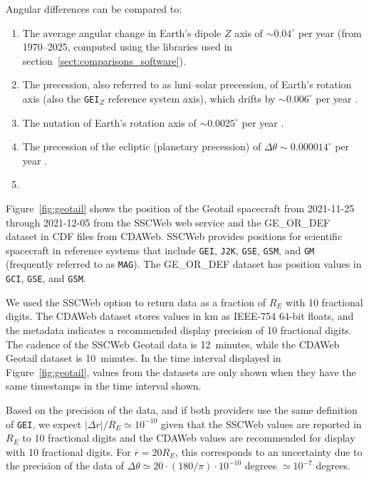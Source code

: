 \documentclass[draft]{agujournal2019}
\begin{document}
\noindent Angular differences can be compared to:
\begin{enumerate}
    \item The average angular change in Earth's dipole $Z$ axis of ${\sim} 0.04^\circ$ per year (from 1970--2025, computed using the libraries used in section~\ref{sect:comparisons_software}).

    \item The precession, also referred to as luni--solar precession, of Earth's rotation axis (also the \texttt{GEI}$_Z$ reference system axis), which drifts by ${\sim} 0.006^\circ$ per year \cite{Hapgood1995}.

    \item The nutation of Earth's rotation axis of ${\sim} 0.0025^\circ$ per year \cite{Hapgood1995}.

    \item The precession of the ecliptic (planetary precession) of $\Delta \theta {\sim} 0.000014^\circ$ per year \cite{Hapgood1995}.

    \item {}
\end{enumerate}

Figure~\ref{fig:geotail} shows the position of the Geotail spacecraft from 2021-11-25 through 2021-12-05 from the SSCWeb web service and the GE\_OR\_DEF dataset in CDF \cite{CDF2025} files from CDAWeb. SSCWeb provides positions for scientific spacecraft in reference systems that include \texttt{GEI}, \texttt{J2K}, \texttt{GSE}, \texttt{GSM}, and \texttt{GM} (frequently referred to as \texttt{MAG}). The GE\_OR\_DEF dataset has position values in \texttt{GCI}, \texttt{GSE}, and \texttt{GSM}.

We used the SSCWeb option to return data as a fraction of $R_E$ with 10 fractional digits. The CDAWeb dataset stores values in km as IEEE-754 64-bit floats, and the metadata indicates a recommended display precision of 10 fractional digits. The cadence of the SSCWeb Geotail data is 12~minutes, while the CDAWeb Geotail dataset is 10~minutes. In the time interval displayed in Figure~\ref{fig:geotail}, values from the datasets are only shown when they have the same timestamps in the time interval shown.

Based on the precision of the data, and if both providers use the same definition of \texttt{GEI}, we expect $|\Delta r|/R_E \simeq 10^{-10}$ given that the SSCWeb values are reported in $R_E$ to $10$ fractional digits and the CDAWeb values are recommended for display with 10 fractional digits. For $\overline{r}=20 R_E$, this corresponds to an uncertainty due to the precision of the data of $\Delta \theta \simeq 20\cdot (180/\pi) \cdot 10^{-10}$ degrees $\simeq 10^{-7}$ degrees.
\end{document}
